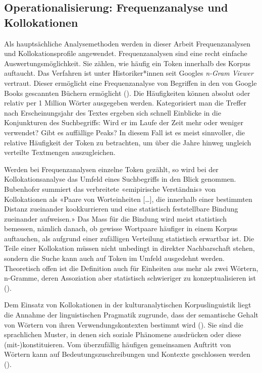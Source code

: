 \subsection{Operationalisierung: Frequenzanalyse und Kollokationen}\label{Kollokationen}

Als hauptsächliche Analysemethoden werden in dieser Arbeit Frequenzanalysen und Kollokationsprofile angewendet. Frequenzanalysen sind eine recht einfache Auswertungsmöglichkeit. Sie zählen, wie häufig ein Token innerhalb des Korpus auftaucht. Das Verfahren ist unter Historiker*innen seit Googles \textit{n-Gram Viewer} vertraut. Dieser ermöglicht eine Frequenzanalyse von Begriffen in den von Google Books gescannten Büchern ermöglicht (\cite{sarasin_sozialgeschichte_2012}). Die Häufigkeiten können absolut oder relativ per 1 Million Wörter ausgegeben werden. Kategorisiert man die Treffer nach Erscheinungsjahr des Textes ergeben sich schnell Einblicke in die Konjunkturen des Suchbegriffs: Wird er im Laufe der Zeit mehr oder weniger verwendet? Gibt es auffällige Peaks? In diesem Fall ist es meist sinnvoller, die relative Häufigkeit der Token zu betrachten, um über die Jahre hinweg ungleich verteilte Textmengen auszugleichen.

Werden bei Frequenzanalysen einzelne Token gezählt, so wird bei der Kollokationsanalyse das Umfeld eines Suchbegriffs in den Blick genommen. Bubenhofer summiert das verbreitete «emipirische Verständnis» von Kollokationen als «Paare von Worteinheiten […], die innerhalb einer bestimmten Distanz zueinander kookkurrieren und eine statistisch feststellbare Bindung zueinander aufweisen.» Das Mass für die Bindung wird meist statistisch bemessen, nämlich danach, ob gewisse Wortpaare häufiger in einem Korpus auftauchen, als aufgrund einer zufälligen Verteilung statistisch erwartbar ist. Die Teile einer Kollokation müssen nicht unbedingt in direkter Nachbarschaft stehen, sondern die Suche kann auch auf Token im Umfeld ausgedehnt werden. Theoretisch offen ist die Definition auch für Einheiten aus mehr als zwei Wörtern, n-Gramme, deren Assoziation aber statistisch schwieriger zu konzeptualisieren ist (\cite[69-70]{bubenhofer_kollokationen_2017}). 

Dem Einsatz von Kollokationen in der kulturanalytischen Korpuslinguistik liegt die Annahme der linguistischen Pragmatik zugrunde, dass der semantische Gehalt von Wörtern von ihren Verwendungskontexten bestimmt wird (\cite[44-46]{bubenhofer_sprachgebrauchsmuster_2009}). Sie sind die sprachlichen Muster, in denen sich soziale Phänomene ausdrücken oder diese (mit-)konstituieren. Vom überzufällig häufigen gemeinsamen Auftritt von Wörtern kann auf Bedeutungszuschreibungen und Kontexte geschlossen werden (\cite[63]{kupietz_korpuslinguistik_2018}).